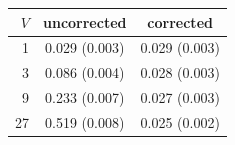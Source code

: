 \begin{tabular}{rcc}
\toprule
$V$ & uncorrected & corrected \\
\midrule
1 & 0.029 (0.003) & 0.029 (0.003) \\
3 & 0.086 (0.004) & 0.028 (0.003) \\
9 & 0.233 (0.007) & 0.027 (0.003) \\
27 & 0.519 (0.008) & 0.025 (0.002) \\
\bottomrule
\end{tabular}